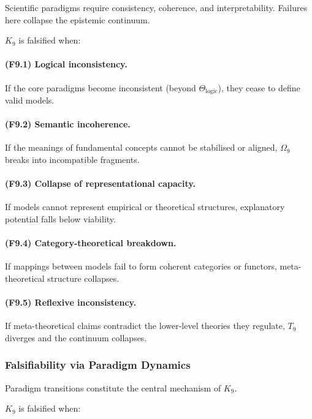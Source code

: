 Scientific paradigms require consistency, coherence, and interpretability.
Failures here collapse the epistemic continuum.

$K_9$ is falsified when:

\paragraph{(F9.1) Logical inconsistency.}
If the core paradigms become inconsistent
(beyond $\Theta_{\mathrm{logic}}$),
they cease to define valid models.

\paragraph{(F9.2) Semantic incoherence.}
If the meanings of fundamental concepts
cannot be stabilised or aligned,
$\Omega_9$ breaks into incompatible fragments.

\paragraph{(F9.3) Collapse of representational capacity.}
If models cannot represent empirical or theoretical structures,
explanatory potential falls below viability.

\paragraph{(F9.4) Category-theoretical breakdown.}
If mappings between models fail to form coherent categories or functors,
meta-theoretical structure collapses.

\paragraph{(F9.5) Reflexive inconsistency.}
If meta-theoretical claims contradict the lower-level theories they regulate,
$T_9$ diverges and the continuum collapses.



\subsubsection{Falsifiability via Paradigm Dynamics}

Paradigm transitions constitute the central mechanism of $K_9$.

$K_9$ is falsified when:

